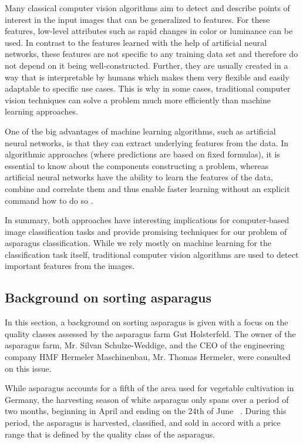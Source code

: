 Many classical computer vision algorithms aim to detect and describe points of interest in the input images that can be generalized to features. For these features, low-level attributes such as rapid changes in color or luminance can be used. In contrast to the features learned with the help of artificial neural networks, these features are not specific to any training data set and therefore do not depend on it being well-constructed. Further, they are usually created in a way that is interpretable by humans which makes them very flexible and easily adaptable to specific use cases. This is why in some cases, traditional computer vision techniques can solve a problem much more efficiently than machine learning approaches.

One of the big advantages of machine learning algorithms, such as artificial neural networks, is that they can extract underlying features from the data. In algorithmic approaches (where predictions are based on fixed formulas), it is essential to know about the components constructing a problem, whereas artificial neural networks have the ability to learn the features of the data, combine and correlate them and thus enable faster learning without an explicit command how to do so \citep{LeCun2015}.

\bigskip
In summary, both approaches have interesting implications for computer-based image classification tasks and provide promising techniques for our problem of asparagus classification. While we rely mostly on machine learning for the classification task itself, traditional computer vision algorithms are used to detect important features from the images.


\subsection{Background on sorting asparagus}
\label{sec:BackgroundSortingAsparagus}

In this section, a background on sorting asparagus is given with a focus on the quality classes assessed by the asparagus farm Gut Holsterfeld. The owner of the asparagus farm, Mr. Silvan Schulze-Weddige, and the CEO of the engineering company HMF Hermeler Maschinenbau, Mr. Thomas Hermeler, were consulted on this issue.

\bigskip
While asparagus accounts for a fifth of the area used for vegetable cultivation in Germany, the harvesting season of white asparagus only spans over a period of two months, beginning in April and ending on the 24th of June ~\citep{spargelstatistik,nrw2018spargel}. During this period, the asparagus is harvested, classified, and sold in accord with a price range that is defined by the quality class of the asparagus.

